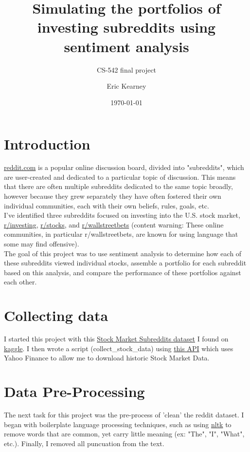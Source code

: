 \documentclass[11pt]{article}
\title{Simulating the portfolios of investing subreddits using sentiment analysis}
\author{CS-542 final project}
\author{Eric Kearney}
\date{\today}
\begin{document}
\maketitle
\thispagestyle{empty}

\section{Introduction}
    \href{reddit.com}{reddit.com} is a popular online discussion board, divided
    into "subreddits", which are user-created and dedicated to a particular
    topic of discussion. This means that there are often multiple subreddits
    dedicated to the same topic broadly, however because they grew separately
    they have often fostered their own individual communities, each with their
    own beliefs, rules, goals, etc.\\

    I've identified three subreddits focused on investing into the U.S. stock
    market, \href{https://www.reddit.com/r/investing/}{r/investing},
    \href{https://www.reddit.com/r/stocks/}{r/stocks}, 
    and \href{https://www.reddit.com/r/wallstreetbets/}{r/wallstreetbets}
    (content warning: These online communities, in particular r/wallstreetbets,
    are known for using language that some may find offensive).\\

    The goal of this project was to use sentiment analysis to determine how
    each of these subreddits viewed individual stocks, assemble a portfolio
    for each subreddit based on this analysis, and compare the performance of
    these portfolios against each other.\\
\section{Collecting data}
    I started this project with this
    \href{https://www.kaggle.com/datasets/yorkehead/stock-market-subreddits}
    {Stock Market Subreddits dataset} I found on
    \href{https://www.kaggle.com/}{kaggle}. I then wrote a script
    (collect\_stock\_data) using
    \href{https://pypi.org/project/yahoo-finance/}{this API} which uses Yahoo
    Finance to allow me to download historic Stock Market Data.
\section{Data Pre-Processing}
    The next task for this project was the pre-process of 'clean' the reddit
    dataset. I began with boilerplate language processing techniques, such as
    using \href{https://www.nltk.org/}{nltk} to remove words that are common,
    yet carry little meaning (ex: "The", "I", "What", etc.). Finally, I
    removed all puncuation from the text.\\
\end{document}
